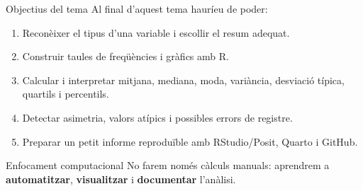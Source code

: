\documentclass[10pt,aspectratio=169]{beamer}
\newcommand{\R}{\textsf{R}}
\newcommand{\RStudio}{\textsf{RStudio/Posit}}
\newcommand{\GitHub}{\textsf{GitHub}}
\newcommand{\important}[1]{\textcolor{UABGreen}{\textbf{#1}}}
\begin{document}
\begin{frame}{Objectius del tema}
Al final d'aquest tema hauríeu de poder:
\begin{enumerate}
  \item Reconèixer el tipus d'una variable i escollir el resum adequat.
  \item Construir taules de freqüències i gràfics amb \R.
  \item Calcular i interpretar mitjana, mediana, moda, variància, desviació típica, quartils i percentils.
  \item Detectar asimetria, valors atípics i possibles errors de registre.
  \item Preparar un petit informe reproduïble amb \RStudio, Quarto i \GitHub.
\end{enumerate}
\vspace{0.2cm}
\begin{block}{Enfocament computacional}
No farem només càlculs manuals: aprendrem a \important{automatitzar}, \important{visualitzar} i \important{documentar} l'anàlisi.
\end{block}
\end{frame}
\end{document}
